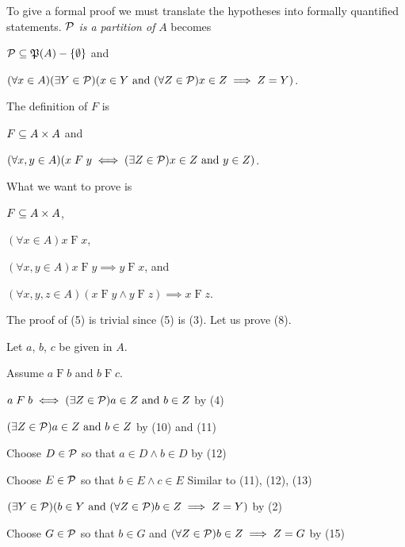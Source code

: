 \begin{solution}
To give a formal proof we must translate the hypotheses into formally quantified statements.
$\mathcal{P}$ \textit{is a partition of} $A$ becomes
\begin{enumarabic}
    \item $\mathcal{P}\subseteq \operatorname{\mathfrak{P}}(A)-\left\{\emptyset\right\}$ and
    \item $(\forall x\in A)(\exists Y\in\mathcal{P})(x\in Y\text{ and } (\forall Z\in\mathcal{P})x\in Z\implies Z=Y)$.
\end{enumarabic}
The definition of $F$ is
\begin{enumarabic}
    \setcounter{enumi}{2}
    \item $F\subseteq A\times A$ and
    \item $(\forall x,y\in A)(x\mathrel{F}y \iff (\exists Z\in\mathcal{P})x\in Z\text{ and } y\in Z)$.
\end{enumarabic}
What we want to prove is
\begin{enumarabic}
    \setcounter{enumi}{4}
    \item $F\subseteq A\times A$,
    \item $(\forall x\in A)x\mathrel F x$,
    \item $(\forall x, y\in A)x\mathrel F y \implies y \mathrel F x$, and
    \item $(\forall x,y,z\in A)(x\mathrel F y\land y\mathrel F z)\implies x\mathrel F z$.
\end{enumarabic}
The proof of (5) is trivial since (5) is (3). Let us prove (8).
\begin{enumarabic}
    \setcounter{enumi}{8}
    \item Let $a$, $b$, $c$ be given in $A$.
    \item \quad Assume $a\mathrel F b$ and $b\mathrel F c$.
    \item \quad\quad $a\mathrel F b\iff (\exists Z\in\mathcal{P})a\in Z\text{ and } b\in Z$ \hfill by (4)
    \item \quad\quad $(\exists Z\in\mathcal{P})a\in Z\text{ and } b\in Z$ \hfill by (10) and (11)
    \item \quad\quad Choose $D\in\mathcal{P}$ so that $a\in D\land b\in D$ \hfill by (12)
    \item \quad\quad Choose $E\in\mathcal{P}$ so that $b\in E\land c\in E$ \hfill Similar to (11), (12), (13)
    \item \quad\quad $(\exists Y\in\mathcal{P})(b\in Y\text{ and } (\forall Z\in\mathcal{P})b\in Z\implies Z=Y)$ \hfill by (2)
    \item \quad\quad Choose $G\in\mathcal{P}$ so that $b\in G$ and $(\forall Z\in\mathcal{P})b\in Z\implies Z=G$ \hfill by (15)

\end{enumarabic}
\end{solution}
